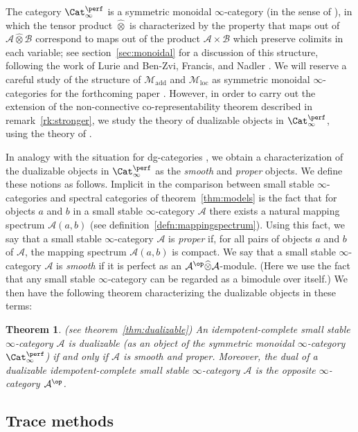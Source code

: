 \documentclass{amsart}
\newcommand{\cM}{{\mathcal M}}
\let\catsymbfont\mathcal
\newcommand{\aA}{{\catsymbfont{A}}}
\newcommand{\aB}{{\catsymbfont{B}}}
\newcommand{\idemstabcat}{\Cat_\i^{\perf}}
\newcommand{\idemtimes}{\widehat{\otimes}}
\renewcommand{\i}{\infty}
\newcommand{\Motadd}{\cM_{\mathrm{add}}}
\newcommand{\Motloc}{\cM_\mathrm{loc}}
\numberwithin{equation}{section}
\newtheorem{theorem}[equation]{Theorem}
\theoremstyle{definition}
\begin{document}
The category $\idemstabcat$ is a symmetric monoidal $\i$-category 
(in the sense of \cite[\S 2]{HAG}), in which the tensor product
$\idemtimes$ is characterized by the property that maps out of
$\aA \idemtimes \aB$ correspond to maps out of the product
$\aA \times \aB$ which preserve colimits in each variable; see
section~\ref{sec:monoidal} for a discussion of this structure,
following the work of Lurie \cite{HAG} and Ben-Zvi, Francis, and Nadler \cite{BFN}.
We will reserve a careful study of the structure of $\Motadd$ and
$\Motloc$ as symmetric monoidal $\i$-categories for the
forthcoming paper \cite{BGT2}. However, in order to carry out the
extension of the non-connective co-representability theorem described
in remark~\ref{rk:stronger}, we study the theory of dualizable objects
in $\idemstabcat$, using the theory of \cite[\S 4.2.5]{HAG}.

In analogy with the situation for dg-categories \cite[\S4]{CisTab},
we obtain a characterization of the dualizable objects in
$\idemstabcat$ as the {\em smooth} and {\em proper} objects.  We
define these notions as follows.  Implicit in the comparison between
small stable $\i$-categories and spectral categories of
theorem~\ref{thm:models} is the fact that for objects $a$ and $b$ in a
small stable $\i$-category $\aA$ there exists a natural mapping
spectrum $\aA(a,b)$ (see definition~\ref{defn:mappingspectrum}).
Using this fact, we say that a small stable $\infty$-category $\aA$ is 
{\em proper} if, for all pairs of objects $a$ and $b$ of $\aA$, the mapping spectrum $\aA(a,b)$ is compact.  We say that a small stable $\infty$-category $\aA$ is {\em smooth} if it is perfect as an $\aA^{\op}\idemtimes\aA$-module.  (Here we use the fact that any small
stable $\i$-category can be regarded as a bimodule over itself.)  We
then have the following theorem characterizing the dualizable objects
in these terms:

\begin{theorem}{(see theorem~\ref{thm:dualizable})}
An idempotent-complete small stable $\infty$-category $\aA$ is
dualizable (as an object of the symmetric monoidal $\infty$-category
$\idemstabcat$) if and only if $\aA$ is smooth and proper.
Moreover, the dual of a dualizable idempotent-complete small stable $\infty$-category $\aA$ is the opposite $\infty$-category $\aA^{\op}$.
\end{theorem}

\subsection{Trace methods}
\end{document}
